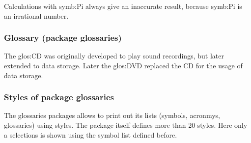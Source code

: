 \begin{filecontents*}{\democodefile}
Calculations with \gls{symb:Pi} always give an inaccurate result,
because \gls{symb:Pi} is an irrational number.


\printglossary[type=symbolslist]
\end{filecontents*}

%

\subsubsection{Glossary (package glossaries)}

\begin{filecontents*}{\democodefile}
The \gls{glos:CD} was originally developed to play sound recordings, but later extended to data storage. Later the \gls{glos:DVD} replaced the CD for the usage of data storage.

\printglossary[style=altlist]
\end{filecontents*}

%

\subsubsection{Styles of package glossaries}

The glossaries packages allows to print out its lists (symbols, acronmys, glossaries) using styles. The package itself defines more than 20 styles. Here only a selections is shown using the symbol list defined before.

\begin{filecontents*}{\democodefile}
\printglossary[type=symbolslist,style=list, title=list]
\end{filecontents*}

